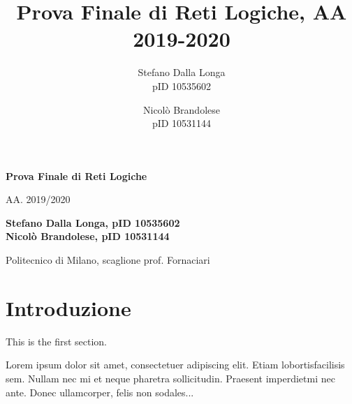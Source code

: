 \documentclass[12pt,a4paper,titlepage]{article}
\author{Stefano Dalla Longa\\pID 10535602 \and Nicolò Brandolese\\pID 10531144}
\date{}
\title{Prova Finale di Reti Logiche, AA 2019-2020}
\begin{document}
	\begin{titlepage}
    \begin{center}
        \vspace*{3cm}
            
        \Huge
        \textbf{Prova Finale di Reti Logiche}
            
        \vspace{0.5cm}
        \LARGE
        AA. 2019/2020
            
        \vspace{1.5cm}
            
        \textbf{Stefano Dalla Longa, pID 10535602 \\ Nicolò Brandolese, pID 10531144}
        
        \vspace{1.2 cm}
        \Large
		Politecnico di Milano, scaglione prof. Fornaciari
            
        \vspace{0.8cm}
            
    \end{center}
\end{titlepage}

	\renewcommand{\contentsname}{Indice}	%

	\tableofcontents
	\clearpage	%
	\section{Introduzione}
   
		This is the first section.
      
		Lorem  ipsum  dolor  sit  amet,  consectetuer  adipiscing  
		elit.   Etiam  lobortisfacilisis sem.  Nullam nec mi et 
		neque pharetra sollicitudin.  Praesent imperdietmi nec ante. 
		Donec ullamcorper, felis non sodales...
       
\end{document}
